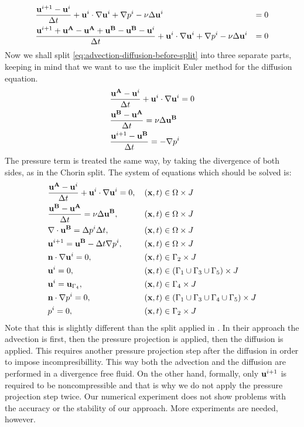 \begin{align}
	&\frac{\mathbf{u}^{i+1} - \mathbf{u}^{i}}{\Delta t} + \mathbf{u}^i \cdot \nabla\mathbf{u}^i + \nabla p^i - \nu \Delta \mathbf{u}^i &= 0 \\
	&\frac{\mathbf{u}^{i+1} + \mathbf{u^A} - \mathbf{u^A} + \mathbf{u^B} - \mathbf{u^B} - \mathbf{u}^{i}}{\Delta t} + \mathbf{u}^i \cdot \nabla\mathbf{u}^i + \nabla p^i - \nu \Delta \mathbf{u}^i &= 0\label{eq:advection-diffusion-before-split}
\end{align}
Now we shall split \cref{eq:advection-diffusion-before-split} into three separate parts, keeping in mind that we want to use the implicit Euler method for the diffusion equation.
\begin{align*}
	&\frac{\mathbf{u^A} - \mathbf{u}^i}{\Delta t} + \mathbf{u}^i \cdot \nabla\mathbf{u}^i = 0 \\
	&\frac{\mathbf{u^B} - \mathbf{u^A}}{\Delta t} =\nu \Delta \mathbf{u^B}\\
	&\frac{\mathbf{u}^{i+1} - \mathbf{u^B}}{\Delta t} = -\nabla p^i
\end{align*}
The pressure term is treated the same way, by taking the divergence of both sides, as in the Chorin split. The system of equations which should be solved is:
\begin{align}
	&\frac{\mathbf{u^A} - \mathbf{u}^i}{\Delta t} + \mathbf{u}^i \cdot \nabla\mathbf{u}^i = 0, &&\left(\mathbf{x}, t\right) \in \Omega \times J \label{eq:general-three-way-split-advection} \\
	&\frac{\mathbf{u^B} - \mathbf{u^A}}{\Delta t} = \nu \Delta \mathbf{u^B}, &&\left(\mathbf{x}, t\right) \in \Omega \times J\\
	&\nabla\cdot\mathbf{u^B} = \Delta p^i \Delta t, &&\left(\mathbf{x}, t\right) \in \Omega \times J\\
	&\mathbf{u}^{i+1} = \mathbf{u^B} - \Delta t \nabla p^{i}, &&\left(\mathbf{x}, t\right) \in \Omega \times J \\
	&\mathbf{n} \cdot \nabla\mathbf{u}^i = 0, && \left(\mathbf{x}, t\right) \in \Gamma_2 \times J \\
	&\mathbf{u}^i = 0, &&\left(\mathbf{x}, t\right) \in \left(\Gamma_1 \cup \Gamma_3 \cup \Gamma_5\right) \times J \\
	&\mathbf{u}^i = \mathbf{u}_{\Gamma_4}, && \left(\mathbf{x}, t\right) \in \Gamma_4 \times J \\
	&\mathbf{n} \cdot \nabla p^i = 0, && \left(\mathbf{x}, t\right) \in (\Gamma_1 \cup \Gamma_3 \cup \Gamma_4 \cup \Gamma_5) \times J \\
	&p^i = 0, && \left(\mathbf{x}, t\right) \in \Gamma_2 \times J
\end{align}
Note that this is slightly different than the split applied in \cite{Bridson}. In their approach the advection is first, then the pressure projection is applied, then the diffusion is applied. This requires another pressure projection step after the diffusion in order to impose incompresibillity. This way both the advection and the diffusion are performed in a divergence free fluid. On the other hand, formally, only $\mathbf{u}^{i+1}$ is required to be noncompressible and that is why we do not apply the pressure projection step twice. Our numerical experiment does not show problems with the accuracy or the stability of our approach. More experiments are needed, however.
